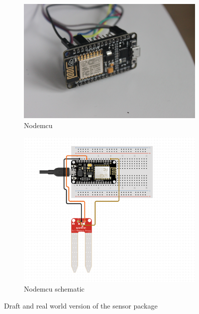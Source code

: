 \documentclass[]{uiophd}
\begin{document}
\begin{figure}
\centering
\begin{subfigure}{.5\textwidth}
  \centering
  \includegraphics[width=.9\linewidth]{nodemcu.jpg}
  \caption{Nodemcu}
  \label{fig:sub1}
\end{subfigure}%
\begin{subfigure}{.5\textwidth}
  \centering
  \includegraphics[width=.9\linewidth]{nodemcu_schematic.png}
  \caption{Nodemcu schematic}
  \label{fig:sub2}
\end{subfigure}
\caption{Draft and real world version of the sensor package}
\label{fig:test}
\end{figure}
\end{document}
